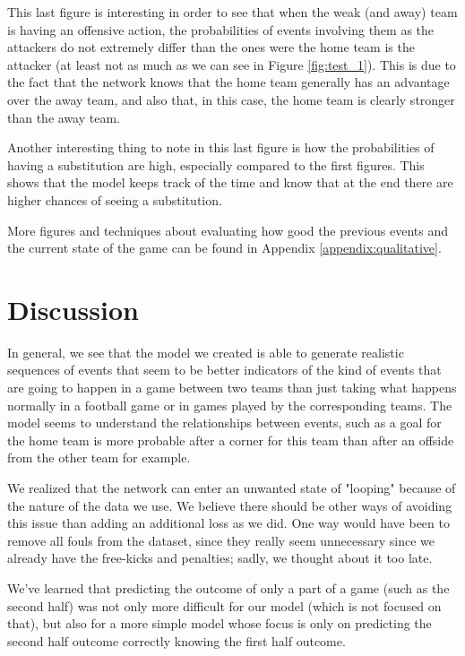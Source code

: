 \documentclass[10pt,conference,onecolumn]{IEEEtran}
\begin{document}
This last figure is interesting in order to see that when the weak (and away) team is having an offensive action, the probabilities of events involving them as the attackers do not extremely differ than the ones were the home team is the attacker (at least not as much as we can see in Figure \ref{fig:test_1}). This is due to the fact that the network knows that the home team generally has an advantage over the away team, and also that, in this case, the home team is clearly stronger than the away team.

Another interesting thing to note in this last figure is how the probabilities of having a substitution are high, especially compared to the first figures. This shows that the model keeps track of the time and know that at the end there are higher chances of seeing a substitution.

More figures and techniques about evaluating how good the previous events and the current state of the game can be found in Appendix \ref{appendix:qualitative}.

\section{Discussion} \label{sec:discussion}
In general, we see that the model we created is able to generate realistic sequences of events that seem to be better indicators of the kind of events that are going to happen in a game between two teams than just taking what happens normally in a football game or in games played by the corresponding teams. The model seems to understand the relationships between events, such as a goal for the home team is more probable after a corner for this team than after an offside from the other team for example.

We realized that the network can enter an unwanted state of "looping" because of the nature of the data we use. We believe there should be other ways of avoiding this issue than adding an additional loss as we did. One way would have been to remove all fouls from the dataset, since they really seem unnecessary since we already have the free-kicks and penalties; sadly, we thought about it too late.

We've learned that predicting the outcome of only a part of a game (such as the second half) was not only more difficult for our model (which is not focused on that), but also for a more simple model whose focus is only on predicting the second half outcome correctly knowing the first half outcome.
\end{document}

